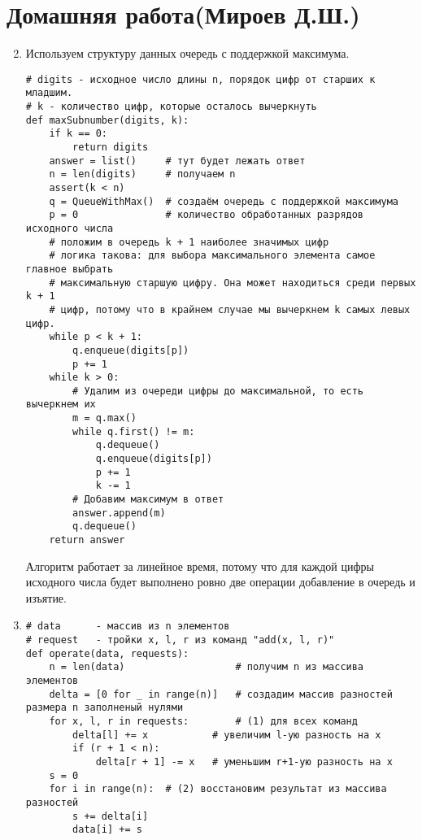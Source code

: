\documentclass{article}
\begin{document}
\section{Домашняя работа(Мироев Д.Ш.)}

\begin{enumerate}

\setcounter{enumi}{1}

\item Используем структуру данных очередь с поддержкой максимума.

\begin{verbatim}
# digits - исходное число длины n, порядок цифр от старших к младшим.
# k - количество цифр, которые осталось вычеркнуть
def maxSubnumber(digits, k):
    if k == 0:
        return digits
    answer = list()     # тут будет лежать ответ
    n = len(digits)     # получаем n 
    assert(k < n)
    q = QueueWithMax()  # создаём очередь с поддержкой максимума
    p = 0               # количество обработанных разрядов исходного числа
    # положим в очередь k + 1 наиболее значимых цифр
    # логика такова: для выбора максимального элемента самое главное выбрать
    # максимальную старшую цифру. Она может находиться среди первых k + 1
    # цифр, потому что в крайнем случае мы вычеркнем k самых левых цифр.
    while p < k + 1:
        q.enqueue(digits[p])
        p += 1
    while k > 0:
        # Удалим из очереди цифры до максимальной, то есть вычеркнем их
        m = q.max()
        while q.first() != m:
            q.dequeue()
            q.enqueue(digits[p])
            p += 1
            k -= 1
        # Добавим максимум в ответ
        answer.append(m)
        q.dequeue()
    return answer
\end{verbatim}

Алгоритм работает за линейное время, потому что для каждой цифры исходного
числа будет выполнено ровно две операции добавление в очередь и изъятие. 

\item 

\begin{verbatim}
# data      - массив из n элементов
# request   - тройки x, l, r из команд "add(x, l, r)"
def operate(data, requests):
    n = len(data)                   # получим n из массива элементов
    delta = [0 for _ in range(n)]   # создадим массив разностей размера n заполненый нулями
    for x, l, r in requests:        # (1) для всех команд
        delta[l] += x           # увеличим l-ую разность на x
        if (r + 1 < n):
            delta[r + 1] -= x   # уменьшим r+1-ую разность на x
    s = 0       
    for i in range(n):  # (2) восстановим результат из массива разностей
        s += delta[i]
        data[i] += s
\end{verbatim}


\end{enumerate}
\end{document}
